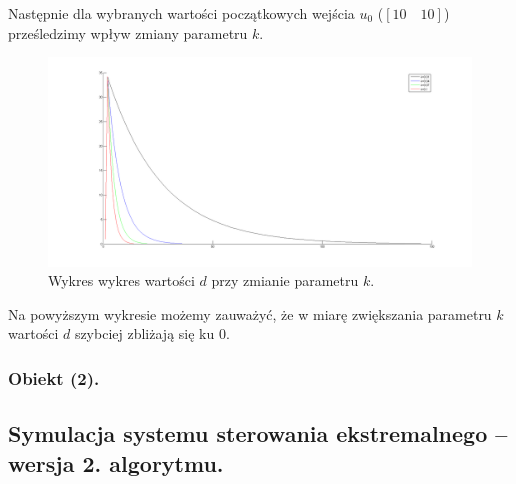 \documentclass[a4paper,10pt]{article}
\begin{document}
Następnie dla wybranych wartości początkowych wejścia $u_0$ ($[10 \quad 10]$) prześledzimy wpływ zmiany parametru $k$.

\begin{figure}[!h]
    \centering
	\includegraphics[width=120mm]{CW4-alg1fun1-u10_10-k001_01-d.png}
	\caption{Wykres wykres wartości $d$ przy zmianie parametru $k$.}
    \label{fig:Rysunek}
\end{figure}

Na powyższym wykresie możemy zauważyć, że w miarę zwiększania parametru $k$ wartości $d$ szybciej zbliżają się ku $0$.
\subsubsection{Obiekt (2).}
\subsection{Symulacja systemu sterowania ekstremalnego – wersja 2. algorytmu.}
\end{document}
